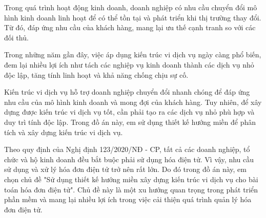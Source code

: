 Trong quá trình hoạt động kinh doanh, doanh nghiệp có nhu cầu chuyển đổi mô hình kinh doanh linh hoạt để có thể tồn tại và phát triển khi thị trường thay đổi. Từ đó, đáp ứng nhu cầu của khách hàng, mang lại ưu thế cạnh tranh so với các đối thủ. 

Trong những năm gần đây, việc áp dụng kiến trúc vi dịch vụ ngày càng phổ biến, đem lại nhiều lợi ích như tách các nghiệp vụ kinh doanh thành các dịch vụ nhỏ độc lập, tăng tính linh hoạt và khả năng chống chịu sự cố.

Kiến trúc vi dịch vụ hỗ trợ doanh nghiệp   chuyển đổi nhanh chóng để đáp ứng nhu cầu của mô hình kinh doanh và mong đợi của khách hàng. Tuy nhiên, để xây dựng được kiến trúc vi dịch vụ tốt, cần phải tạo ra các dịch vụ nhỏ phù hợp và duy trì tính độc lập. Trong đồ án này, em sử dụng thiết kế hướng miền để phân tích và xây dựng kiến trúc vi dịch vụ.

Theo quy định của Nghị định 123/2020/NĐ - CP, tất cả các doanh nghiệp, tổ chức và hộ kinh doanh đều bắt buộc phải   sử dụng hóa điện tử. Vì vậy, nhu cầu sử dụng và xử lý hóa đơn điện tử trở nên rất lớn. Do đó trong đồ án này, em chọn chủ đề "Sử dụng thiết kế hướng miền xây dựng kiến trúc vi dịch vụ cho bài toán hóa đơn điện tử". Chủ đề này là một xu hướng quan trọng trong phát triển phần mềm và mang lại nhiều lợi ích trong việc cải thiện quá trình quản lý hóa đơn điện tử.


 



